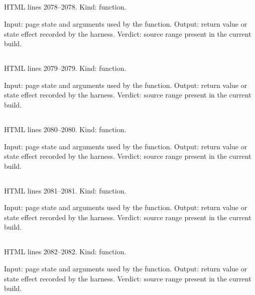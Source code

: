\subsection*{\texttt{}}
\label{vf_20_esc}
HTML lines 2078--2078. Kind: function.

Input: page state and arguments used by the function.
Output: return value or state effect recorded by the harness.
Verdict: source range present in the current build.

\subsection*{\texttt{}}
\label{vf_21_xesc}
HTML lines 2079--2079. Kind: function.

Input: page state and arguments used by the function.
Output: return value or state effect recorded by the harness.
Verdict: source range present in the current build.

\subsection*{\texttt{}}
\label{vf_22_safeName}
HTML lines 2080--2080. Kind: function.

Input: page state and arguments used by the function.
Output: return value or state effect recorded by the harness.
Verdict: source range present in the current build.

\subsection*{\texttt{}}
\label{vf_23_bytesFrom}
HTML lines 2081--2081. Kind: function.

Input: page state and arguments used by the function.
Output: return value or state effect recorded by the harness.
Verdict: source range present in the current build.

\subsection*{\texttt{}}
\label{vf_24_scrollToEl}
HTML lines 2082--2082. Kind: function.

Input: page state and arguments used by the function.
Output: return value or state effect recorded by the harness.
Verdict: source range present in the current build.

